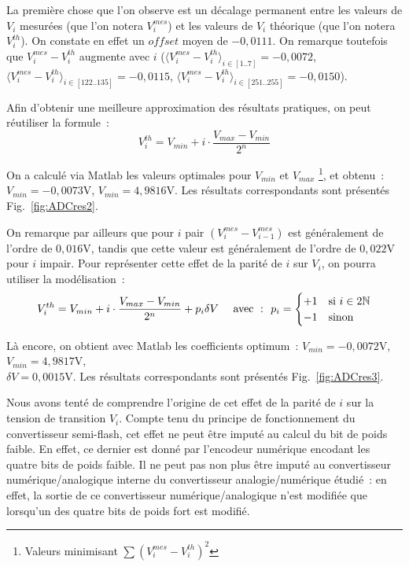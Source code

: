 \documentclass{article}
\begin{document}
La première chose que l'on observe est un décalage permanent entre les valeurs de $V_i$ mesurées (que l'on notera $V_i^{mes}$) et les valeurs de $V_i$ théorique (que l'on notera $V_i^{th}$). On constate en effet un $offset$ moyen de $-0,0111$. On remarque toutefois que $V_i^{mes}-V_i^{th}$ augmente avec $i$ (${\langle V_i^{mes}-V_i^{th}\rangle_{i\in[1..7]}=-0,0072}$, ${\langle V_i^{mes}-V_i^{th}\rangle_{i\in[122..135]}=-0,0115}$, ${\langle V_i^{mes}-V_i^{th}\rangle_{i\in[251..255]}=-0,0150}$). 

Afin d'obtenir une meilleure approximation des résultats pratiques, on peut réutiliser la formule~:
\begin{equation*}
V_i^{th} = V_{min}+i\cdot\frac{V_{max}-V_{min}}{2^n}
\end{equation*}

On a calculé via Matlab les valeurs optimales pour $V_{min}$ et $V_{max}$ \footnote{Valeurs minimisant $\sum (V_i^{mes}-V_i^{th})^2$}, et obtenu~: ${V_{min}=-0,0073\mathrm{V}}$, ${V_{min}=4,9816\mathrm{V}}$. Les résultats correspondants sont présentés Fig.~\ref{fig:ADCres2}.

On remarque par ailleurs que pour $i$ pair $(V_i^{mes}-V_{i-1}^{mes})$ est généralement de l'ordre de $0,016\mathrm{V}$, tandis que cette valeur est généralement de l'ordre de $0,022\mathrm{V}$ pour $i$ impair. Pour représenter cette effet de la parité de $i$ sur $V_i$, on pourra utiliser la modélisation~: 
\begin{equation*}
V_i^{th} = V_{min}+i\cdot\frac{V_{max}-V_{min}}{2^n}+p_i\delta V \mathrm{~~~~avec~:~~}p_i = \begin{cases} +1 &\mathrm{si~} i\in 2\mathbb{N} \\ -1 & \mbox{sinon}\end{cases}
\end{equation*}

Là encore, on obtient avec Matlab les coefficients optimum~: ${V_{min}=-0,0072\mathrm{V}}$, ${V_{min}=4,9817\mathrm{V}}$, \\${\delta V=0,0015\mathrm{V}}$. Les résultats correspondants sont présentés Fig.~\ref{fig:ADCres3}.



Nous avons tenté de comprendre l'origine de cet effet de la parité de $i$ sur la tension de transition $V_i$. Compte tenu du principe de fonctionnement du convertisseur semi-flash, cet effet ne peut être imputé au calcul du bit de poids faible. En effet, ce dernier est donné par l'encodeur numérique encodant les quatre bits de poids faible. Il ne peut pas non plus être imputé au convertisseur numérique/analogique interne du convertisseur analogie/numérique étudié~: en effet, la sortie de ce convertisseur numérique/analogique n'est modifiée que lorsqu'un des quatre bits de poids fort est modifié. 
\end{document}

